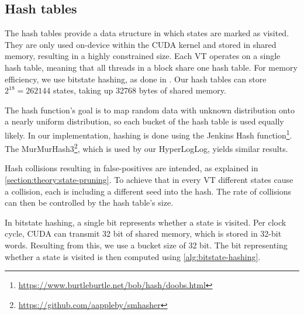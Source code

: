 \documentclass[
fancyheadings, %
%
%
]{stsreprt}
\begin{document}

\subsection{Hash tables}

The hash tables provide a data structure in which states are marked as visited.
They are only used on-device within the CUDA kernel and stored in shared memory, resulting in a highly constrained size.
Each VT operates on a single hash table, meaning that all threads in a block share one hash table.
For memory efficiency, we use bitstate hashing, as done in \cite{DeFrancisco2020.Grapple}.
Our hash tables can store $2^{18}=262144$ states, taking up 32768 bytes of shared memory.

The hash function's goal is to map random data with unknown distribution onto a nearly uniform distribution, so each bucket of the hash table is used equally likely.
In our implementation, hashing is done using the Jenkins Hash function\footnote{\url{https://www.burtleburtle.net/bob/hash/doobs.html}}.
The MurMurHash3\footnote{\url{https://github.com/aappleby/smhasher}}, which is used by our HyperLogLog, yields similar results.

Hash collisions resulting in false-positives are intended, as explained in \cref{section:theory:state-pruning}.
To achieve that in every VT different states cause a collision, each is including a different seed into the hash.
The rate of collisions can then be controlled by the hash table's size.

In bitstate hashing, a single bit represents whether a state is visited.
Per clock cycle, CUDA can transmit 32 bit of shared memory, which is stored in 32-bit words.
Resulting from this, we use a bucket size of 32 bit.
The bit representing whether a state is visited is then computed using \cref{alg:bitstate-hashing}.
\end{document}
